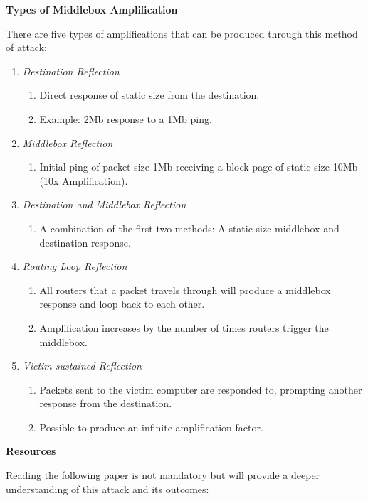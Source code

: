 \documentclass[letterpaper,12pt]{report}
\begin{document}
\textbf{Types of Middlebox Amplification}

There are five types of amplifications that can be produced through this method of attack:

\begin{enumerate}
    \item \textit{Destination Reflection}
    \begin{enumerate}
        \item Direct response of static size from the destination.
        \item Example: 2Mb response to a 1Mb ping.
    \end{enumerate}
    \item \textit{Middlebox Reflection}
    \begin{enumerate}
        \item Initial ping of packet size 1Mb receiving a block page of static size 10Mb (10x Amplification).
    \end{enumerate}
    \item \textit{Destination and Middlebox Reflection}
    \begin{enumerate}
        \item A combination of the first two methods: A static size middlebox and destination response.
    \end{enumerate}
    \item \textit{Routing Loop Reflection}
    \begin{enumerate}
        \item All routers that a packet travels through will produce a middlebox response and loop back to each other.
        \item Amplification increases by the number of times routers trigger the middlebox.
    \end{enumerate}
    \item \textit{Victim-sustained Reflection}
    \begin{enumerate}
        \item Packets sent to the victim computer are responded to, prompting another response from the destination.
        \item Possible to produce an infinite amplification factor.
    \end{enumerate}
\end{enumerate}

\textbf{Resources}

Reading the following paper is not mandatory but will provide a deeper understanding of this attack and its outcomes:
\end{document}
